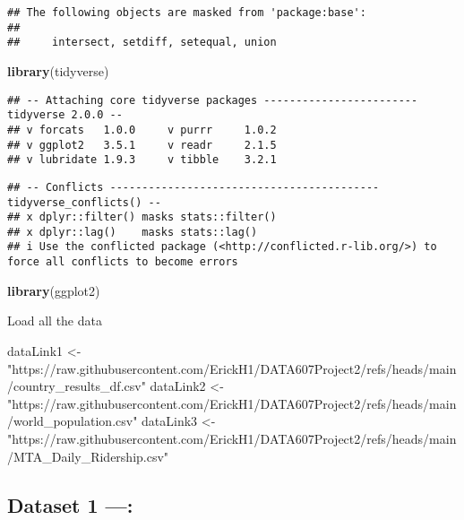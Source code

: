 \documentclass[
]{article}
\newenvironment{Shaded}{\begin{snugshade}}{\end{snugshade}}
\newcommand{\FunctionTok}[1]{\textcolor[rgb]{0.13,0.29,0.53}{\textbf{#1}}}
\newcommand{\NormalTok}[1]{#1}
\newcommand{\OtherTok}[1]{\textcolor[rgb]{0.56,0.35,0.01}{#1}}
\newcommand{\StringTok}[1]{\textcolor[rgb]{0.31,0.60,0.02}{#1}}
\begin{document}
\begin{verbatim}
## The following objects are masked from 'package:base':
## 
##     intersect, setdiff, setequal, union
\end{verbatim}

\begin{Shaded}
\begin{Highlighting}[]
\FunctionTok{library}\NormalTok{(tidyverse)}
\end{Highlighting}
\end{Shaded}

\begin{verbatim}
## -- Attaching core tidyverse packages ------------------------ tidyverse 2.0.0 --
## v forcats   1.0.0     v purrr     1.0.2
## v ggplot2   3.5.1     v readr     2.1.5
## v lubridate 1.9.3     v tibble    3.2.1
\end{verbatim}

\begin{verbatim}
## -- Conflicts ------------------------------------------ tidyverse_conflicts() --
## x dplyr::filter() masks stats::filter()
## x dplyr::lag()    masks stats::lag()
## i Use the conflicted package (<http://conflicted.r-lib.org/>) to force all conflicts to become errors
\end{verbatim}

\begin{Shaded}
\begin{Highlighting}[]
\FunctionTok{library}\NormalTok{(ggplot2)}
\end{Highlighting}
\end{Shaded}

Load all the data

\begin{Shaded}
\begin{Highlighting}[]
\NormalTok{dataLink1 }\OtherTok{\textless{}{-}} \StringTok{"https://raw.githubusercontent.com/ErickH1/DATA607Project2/refs/heads/main/country\_results\_df.csv"}
\NormalTok{dataLink2 }\OtherTok{\textless{}{-}} \StringTok{"https://raw.githubusercontent.com/ErickH1/DATA607Project2/refs/heads/main/world\_population.csv"}
\NormalTok{dataLink3 }\OtherTok{\textless{}{-}} \StringTok{"https://raw.githubusercontent.com/ErickH1/DATA607Project2/refs/heads/main/MTA\_Daily\_Ridership.csv"}
\end{Highlighting}
\end{Shaded}

\subsection{Dataset 1 ---:}\label{dataset-1}
\end{document}
